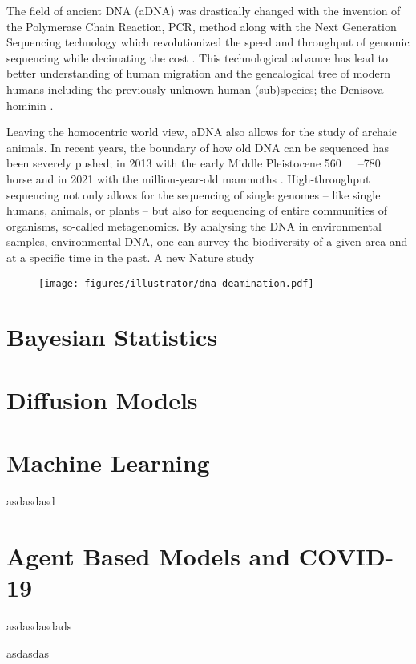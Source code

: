 The field of ancient DNA (aDNA) was drastically changed with the invention of the Polymerase Chain Reaction, PCR, method \autocite{mullisSpecificEnzymaticAmplification1986} along with the Next Generation Sequencing technology which revolutionized the speed and throughput of genomic sequencing while decimating the cost \autocite{slatkoOverviewNextGeneration2018}. This technological advance has lead to better understanding of human migration and the genealogical tree of modern humans including the previously unknown human (sub)species; the Denisova hominin \autocite{krauseCompleteMitochondrialDNA2010}.

Leaving the homocentric world view, aDNA also allows for the study of archaic animals. In recent years, the boundary of how old DNA can be sequenced has been severely pushed; in 2013 with the early Middle Pleistocene \qtyrange[range-phrase = --,range-units = single]{560}{780}{\kilo\year\BP} horse \autocite{orlandoRecalibratingEquusEvolution2013} and in 2021 with the million-year-old mammoths \autocite{vandervalkMillionyearoldDNASheds2021}. High-throughput sequencing not only allows for the sequencing of single genomes -- like single humans, animals, or plants -- but also for sequencing of entire communities of organisms, so-called metagenomics. By analysing the DNA in environmental samples, environmental DNA, one can survey the biodiversity of a given area and at a specific time in the past. A new Nature study 



\begin{figure}[htbp]
    \label{fig:figure-text}
    \texttt{[image: figures/illustrator/dna-deamination.pdf]}
\end{figure}




\section{Bayesian Statistics}
\label{section:Bayesian}

\section{Diffusion Models}
\label{section:diffusion}


\section{Machine Learning}
\label{section:machine-learning}

asdasdasd


\section{Agent Based Models and COVID-19}
\label{section:agent-based-models}

asdasdasdads


asdasdas
